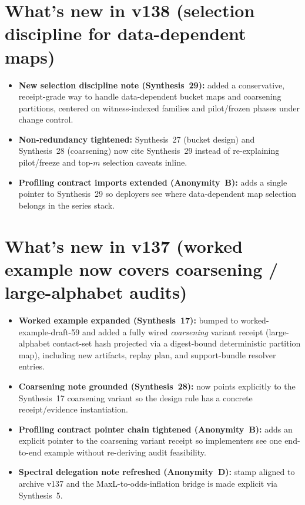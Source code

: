\documentclass[11pt]{article}
\begin{document}
\section{What's new in v138 (selection discipline for data-dependent maps)}
\begin{itemize}[leftmargin=*]
\item \textbf{New selection discipline note (Synthesis~29):} added a conservative, receipt-grade way to handle data-dependent bucket maps and coarsening partitions, centered on witness-indexed families and pilot/frozen phases under change control.
\item \textbf{Non-redundancy tightened:} Synthesis~27 (bucket design) and Synthesis~28 (coarsening) now cite Synthesis~29 instead of re-explaining pilot/freeze and top-$m$ selection caveats inline.
\item \textbf{Profiling contract imports extended (Anonymity~B):} adds a single pointer to Synthesis~29 so deployers see where data-dependent map selection belongs in the series stack.
\end{itemize}

\section{What's new in v137 (worked example now covers coarsening / large-alphabet audits)}
\begin{itemize}[leftmargin=*]
\item \textbf{Worked example expanded (Synthesis~17):} bumped to worked-example-draft-59 and added a fully wired \emph{coarsening} variant receipt (large-alphabet contact-set hash projected via a digest-bound deterministic partition map), including new artifacts, replay plan, and support-bundle resolver entries.
\item \textbf{Coarsening note grounded (Synthesis~28):} now points explicitly to the Synthesis~17 coarsening variant so the design rule has a concrete receipt/evidence instantiation.
\item \textbf{Profiling contract pointer chain tightened (Anonymity~B):} adds an explicit pointer to the coarsening variant receipt so implementers see one end-to-end example without re-deriving audit feasibility.
\item \textbf{Spectral delegation note refreshed (Anonymity~D):} stamp aligned to archive v137 and the MaxL-to-odds-inflation bridge is made explicit via Synthesis~5.
\end{itemize}
\end{document}
